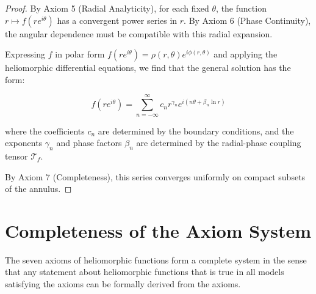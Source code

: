 \begin{proof}
By Axiom 5 (Radial Analyticity), for each fixed $\theta$, the function $r \mapsto f(re^{i\theta})$ has a convergent power series in $r$. By Axiom 6 (Phase Continuity), the angular dependence must be compatible with this radial expansion.

Expressing $f$ in polar form $f(re^{i\theta}) = \rho(r,\theta)e^{i\phi(r,\theta)}$ and applying the heliomorphic differential equations, we find that the general solution has the form:

\begin{equation}
f(re^{i\theta}) = \sum_{n=-\infty}^{\infty} c_n r^{\gamma_n} e^{i(n\theta + \beta_n \ln r)}
\end{equation}

where the coefficients $c_n$ are determined by the boundary conditions, and the exponents $\gamma_n$ and phase factors $\beta_n$ are determined by the radial-phase coupling tensor $\mathcal{T}_f$.

By Axiom 7 (Completeness), this series converges uniformly on compact subsets of the annulus.
\end{proof}

\section{Completeness of the Axiom System}

\begin{theorem}
The seven axioms of heliomorphic functions form a complete system in the sense that any statement about heliomorphic functions that is true in all models satisfying the axioms can be formally derived from the axioms.
\end{theorem}

